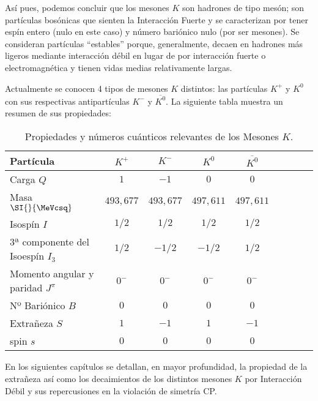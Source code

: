 Así pues, podemos concluir que los mesones $K$ son hadrones de tipo mesón; son partículas bosónicas que sienten la Interacción Fuerte y se caracterizan por tener espín entero (nulo en este caso) y número bariónico nulo (por ser mesones). Se consideran partículas ``estables'' porque, generalmente, decaen en hadrones más ligeros mediante interacción débil en lugar de por interacción fuerte o electromagnética y tienen vidas medias relativamente largas.

Actualmente se conocen 4 tipos de mesones $K$ distintos: las partículas $K^+$ y $K^0$ con sus respectivas antipartículas $K^-$ y $\overline{K^0}$. La siguiente tabla muestra un resumen de sus propiedades:\\

\begin{table}[h]
	\centering
	\begin{tabular}{l*{7}{c}r}
\hline
Partícula & $K^+$ & $K^-$ & $K^0$ & $\overline{K^0}$ \\ 
\hline
Carga $Q$ & $1$ & $-1$ & $0$ & $0$\\
Masa $\SI{}{\MeVcsq}$ & $493,677$ & $493,677$ & $497,611$ & $497,611$\\
Isospín $I$ & $1/2$ & $1/2$ & $1/2$ & $1/2$ \\
3ª componente del Isoespín $I_3$ & $1/2$ & $-1/2$ & $-1/2$ & $1/2$ \\
Momento angular y paridad $J^\pi$ & $0^-$ & $0^-$ & $0^-$ & $0^-$ \\
Nº Bariónico $B$ & $0$ & $0$ & $0$ & $0$\\
Extrañeza $S$ & $1$ & $-1$ & $1$ & $-1$\\
spin $s$ & $0$ & $0$ & $0$ & $0$\\ 
\hline
	\end{tabular}
\caption[Propiedades y números cuánticos relevantes de los Mesones $K$]{Propiedades y números cuánticos relevantes de los Mesones $K$.\protect\footnotemark}
\label{tab:propiedades}
\end{table}


En los siguientes capítulos se detallan, en mayor profundidad, la propiedad de la extrañeza así como los decaimientos de los distintos mesones $K$ por Interacción Débil y sus repercusiones en la violación de simetría CP.




